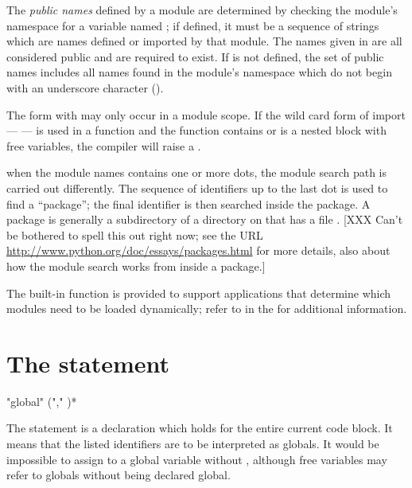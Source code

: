 The \emph{public names} defined by a module are determined by checking
the module's namespace for a variable named ; if
defined, it must be a sequence of strings which are names defined or
imported by that module.  The names given in  are all
considered public and are required to exist.  If  is not
defined, the set of public names includes all names found in the
module's namespace which do not begin with an underscore character
(\character{_}).

The  form with \samp{*} may only occur in a module
scope.  If the wild card form of import ---  --- is
used in a function and the function contains or is a nested block with
free variables, the compiler will raise a .


when the module names contains one or more dots, the module search
path is carried out differently.  The sequence of identifiers up to
the last dot is used to find a ``package''; the final
identifier is then searched inside the package.  A package is
generally a subdirectory of a directory on  that has a
file .
%
[XXX Can't be bothered to spell this out right now; see the URL
\url{http://www.python.org/doc/essays/packages.html} for more details, also
about how the module search works from inside a package.]

The built-in function  is provided to support
applications that determine which modules need to be loaded
dynamically; refer to  in the
 for additional
information.


\section{The  statement \label{global}}

\begin{productionlist}
             {"global"  ("," )*}
\end{productionlist}

The  statement is a declaration which holds for the
entire current code block.  It means that the listed identifiers are to be
interpreted as globals.  It would be impossible to assign to a global
variable without , although free variables may refer
to globals without being declared global.

